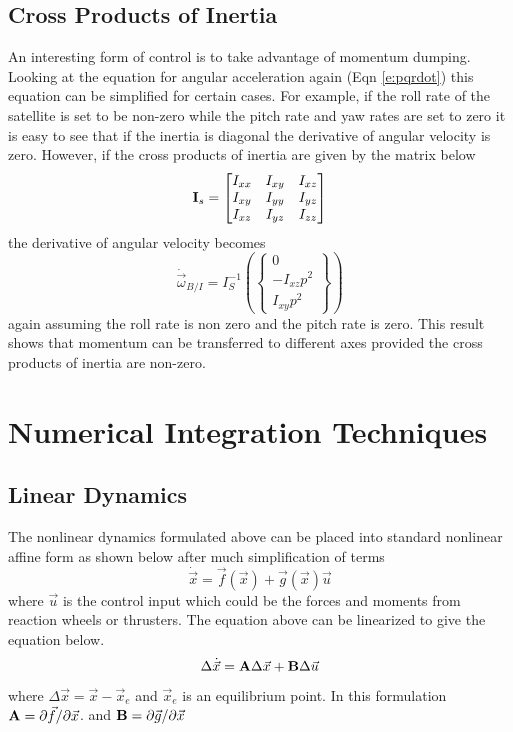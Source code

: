 \documentclass{article}
\begin{document}
\subsection{Cross Products of Inertia}

An interesting form of control is to take advantage of momentum
dumping. Looking at the equation for angular acceleration again (Eqn \ref{e:pqrdot}) this
equation can be simplified for certain cases. For example, if the roll
rate of the satellite is set to be non-zero while the pitch rate and
yaw rates are set to zero it is easy to see that if the inertia is
diagonal the derivative of angular velocity is zero. However, if the
cross products of inertia are given by the matrix below
\begin{equation}
  {\bf I}_s = \begin{bmatrix} I_{xx} & I_{xy} & I_{xz} \\ I_{xy} &
    I_{yy} & I_{yz} \\ I_{xz} & I_{yz} & I_{zz} \end{bmatrix}
\end{equation}
the derivative of angular velocity becomes
\begin{equation}
  \dot{\vec{\omega}}_{B/I} = I_S^{-1} \left (\begin{Bmatrix} 0
    \\ -I_{xz}p^2 \\ I_{xy}p^2 \end{Bmatrix} \right )
\end{equation}
again assuming the roll rate is non zero and the pitch rate is
zero. This result shows that momentum can be transferred to different
axes provided the cross products of inertia are non-zero. 

\section{Numerical Integration Techniques}

\subsection{Linear Dynamics}

The nonlinear dynamics formulated above can be placed into standard
nonlinear affine form as shown below after much simplification of
terms
\begin{equation}
  \dot{\vec{x}} = \vec{f}(\vec{x}) + \vec{g}(\vec{x})\vec{u}
\end{equation}
where $\vec{u}$ is the control input which could be the forces and
moments from reaction wheels or thrusters. The equation above can be
linearized to give the equation below. 
\begin{equation}
  \Delta \dot{\vec{x}} = {\bf A}\Delta {\vec{x}} + {\bf B}\Delta \vec{u}
\end{equation}
where $\Delta \vec{x} = \vec{x} - \vec{x}_e$ and $\vec{x}_e$ is an
equilibrium point. In this formulation ${\bf A} = \partial \vec{f}/\partial \vec{x}$. and 
${\bf B} = \partial \vec{g}/\partial \vec{x}$
\end{document}

